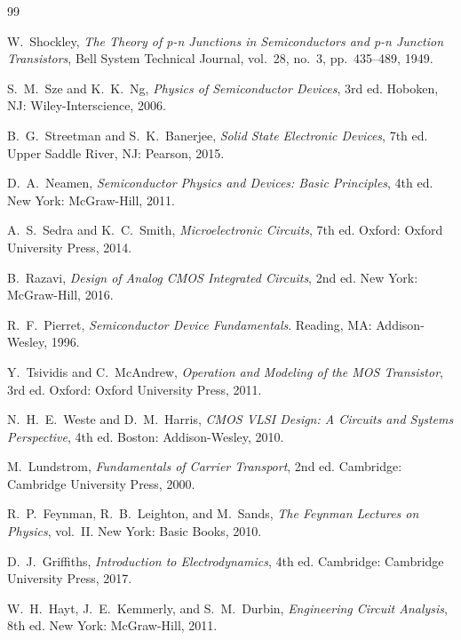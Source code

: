 ﻿\documentclass[12pt, a4paper]{article}
\begin{document}
	\begin{thebibliography}{99}
		
		W.~Shockley,
		\textit{The Theory of p-n Junctions in Semiconductors and p-n Junction Transistors},
		Bell System Technical Journal, vol.~28, no.~3, pp.~435--489, 1949.
		
		S.~M.~Sze and K.~K.~Ng,
		\textit{Physics of Semiconductor Devices}, 3rd ed.
		Hoboken, NJ: Wiley-Interscience, 2006.
		
		B.~G.~Streetman and S.~K.~Banerjee,
		\textit{Solid State Electronic Devices}, 7th ed.
		Upper Saddle River, NJ: Pearson, 2015.
		
		D.~A.~Neamen,
		\textit{Semiconductor Physics and Devices: Basic Principles}, 4th ed.
		New York: McGraw-Hill, 2011.
		
		A.~S.~Sedra and K.~C.~Smith,
		\textit{Microelectronic Circuits}, 7th ed.
		Oxford: Oxford University Press, 2014.
		
		B.~Razavi,
		\textit{Design of Analog CMOS Integrated Circuits}, 2nd ed.
		New York: McGraw-Hill, 2016.
		
		R.~F.~Pierret,
		\textit{Semiconductor Device Fundamentals}.
		Reading, MA: Addison-Wesley, 1996.
		
		Y.~Tsividis and C.~McAndrew,
		\textit{Operation and Modeling of the MOS Transistor}, 3rd ed.
		Oxford: Oxford University Press, 2011.
		
		N.~H.~E.~Weste and D.~M.~Harris,
		\textit{CMOS VLSI Design: A Circuits and Systems Perspective}, 4th ed.
		Boston: Addison-Wesley, 2010.
		
		M.~Lundstrom,
		\textit{Fundamentals of Carrier Transport}, 2nd ed.
		Cambridge: Cambridge University Press, 2000.
		
		R.~P.~Feynman, R.~B.~Leighton, and M.~Sands,
		\textit{The Feynman Lectures on Physics}, vol.~II.
		New York: Basic Books, 2010.
		
		D.~J.~Griffiths,
		\textit{Introduction to Electrodynamics}, 4th ed.
		Cambridge: Cambridge University Press, 2017.
		
		W.~H.~Hayt, J.~E.~Kemmerly, and S.~M.~Durbin,
		\textit{Engineering Circuit Analysis}, 8th ed.
		New York: McGraw-Hill, 2011.
		

\end{thebibliography}
\end{document}
